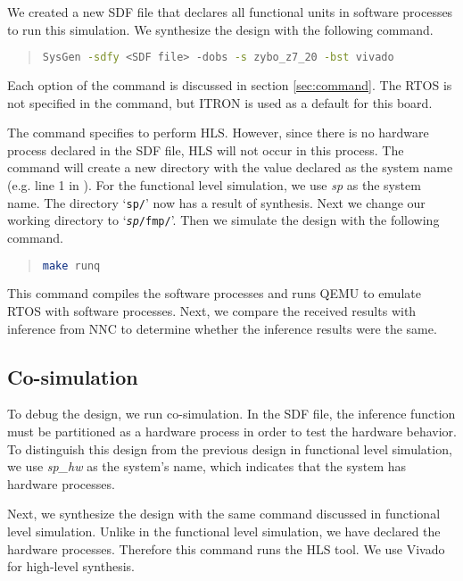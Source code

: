 We created a new SDF file that declares all functional units in software processes to run this simulation. We synthesize the design with the following command.

\begin{quote}
\begin{lstlisting}[language=bash, numbers=none, frame=l]
SysGen -sdfy <SDF file> -dobs -s zybo_z7_20 -bst vivado
\end{lstlisting}
\end{quote}

Each option of the command is discussed in section \ref{sec:command}. The RTOS is not specified in the command, but ITRON is used as a default for this board.

The command specifies to perform HLS. However, since there is no hardware process declared in the SDF file, HLS will not occur in this process. The command will create a new directory with the value declared as the system name (e.g. line 1 in ). For the functional level simulation, we use \emph{sp} as the system name. The directory `\texttt{sp/}' now has a result of synthesis. Next we change our working directory to `\texttt{\textit{sp}/fmp/}'. Then we simulate the design with the following command.

\begin{quote}
\begin{lstlisting}[language=bash, numbers=none, frame=l]
make runq
\end{lstlisting}
\end{quote}

This command compiles the software processes and runs QEMU to emulate RTOS with software processes. Next, we compare the received results with inference from NNC to determine whether the inference results were the same.

\subsection{Co-simulation}

To debug the design, we run co-simulation. In the SDF file, the inference function must be partitioned as a hardware process in order to test the hardware behavior. To distinguish this design from the previous design in functional level simulation, we use \emph{sp\_hw} as the system's name, which indicates that the system has hardware processes.

Next, we synthesize the design with the same command discussed in functional level simulation. Unlike in the functional level simulation, we have declared the hardware processes. Therefore this command runs the HLS tool. We use Vivado for high-level synthesis.

